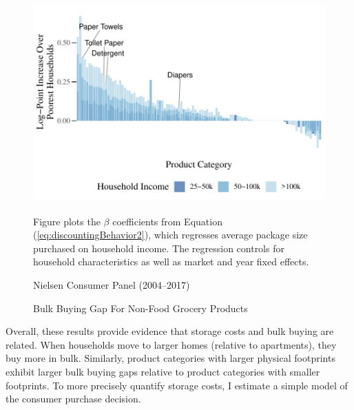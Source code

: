 \documentclass[AER]{AEA_mal}
\begin{document}
\begin{figure}[!htb]
\centering
\caption{Bulk Buying Gap For Non-Food Grocery Products}
\includegraphics[width = 5in, height = 3in]{../5_figures/discountingBehaviorChannelNonFoodColor.pdf}
\begin{figurenotes}
Figure plots the $\beta$ coefficients from Equation (\ref{eq:discountingBehavior2}), which regresses average package size purchased on household income. The regression controls for household characteristics as well as market and year fixed effects.
\end{figurenotes}
\begin{figurenotes}[Source]
Nielsen Consumer Panel (2004--2017)
\end{figurenotes}
\label{fig:discountingBehaviorChannelNonFood}
\end{figure}

Overall, these results provide evidence that storage costs and bulk buying are related. When households move to larger homes (relative to apartments), they buy more in bulk. Similarly, product categories with larger physical footprints exhibit larger bulk buying gaps relative to product categories with smaller footprints. To more precisely quantify storage costs, I estimate a simple model of the consumer purchase decision.
\end{document}
